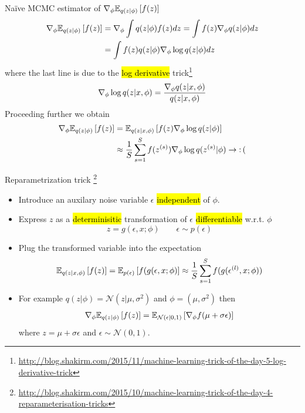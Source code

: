 \documentclass[unicode,11pt]{beamer}
\begin{document}
\begin{frame}{Na\"ive MCMC estimator of $\grad_\phi \E{q(z|\phi)}{f(z)}$}
  \begin{align*}
    \grad_\phi \E{q(z|\phi)}{f(z)}
    &= \grad_\phi \int q(z|\phi) f(z) dz
     = \int f(z) \grad_\phi q(z|\phi) dz \\
    &= \int f(z) q(z|\phi) \grad_\phi \log q(z|\phi) dz
  \end{align*}
  where the last line is due to the \hl{log derivative}
  trick\footnote{%
    \url{http://blog.shakirm.com/2015/11/machine-learning-trick-of-the-day-5-log-derivative-trick}}
  $$
  \nabla_\phi \log q(z|x, \phi) = \frac{\nabla_\phi q(z|x, \phi)}{q(z|x, \phi)}
  $$
  Proceeding further we obtain
  \begin{align*}
    \grad_\phi \E{q(z|\phi)}{f(z)}
    &= \E{q(z|x, \phi)}{f(z) \grad_\phi \log q(z|\phi)} \\
    &\approx \frac{1}{S} \sum\limits_{s = 1}^S f(z^{(s)}) \grad_\phi \log q(z^{(s)}|\phi)
    \to \op{:(}
  \end{align*}

\end{frame}


\begin{frame}{Reparametrization trick%
  \footnote{\url{http://blog.shakirm.com/2015/10/machine-learning-trick-of-the-day-4-reparameterisation-tricks}}}
  \begin{itemize}
  \item Introduce an auxilary noise variable $\epsilon$ \hl{independent} of
    $\phi$.
  \item Express $z$ as a \hl{determinisitic} transformation of $\epsilon$
    \hl{differentiable} w.r.t. $\phi$
    $$
    z = g(\epsilon, x; \phi)
    \qquad
    \epsilon \sim p(\epsilon)
    $$
  \item Plug the transformed variable into the expectation
    $$
    \E{q(z|x, \phi)}{f(z)}
    = \E{p(\epsilon)}{f(g(\epsilon, x; \phi)}
    \approx \frac{1}{S} \sum\limits_{s = 1}^S f(g(\epsilon^{(l)}, x; \phi))
    $$
  \item For example $q(z|\phi) = \mathcal{N}(z|\mu, \sigma^2)$ and
    $\phi = (\mu, \sigma^2)$ then
    \begin{align*}
      \grad_\phi \E{q(z|\phi)}{f(z)}
      = \E{\mathcal{N}(\epsilon|0, 1)}{\grad_\phi f(\mu + \sigma \epsilon)}
    \end{align*}
    where $z = \mu + \sigma\epsilon$ and $\epsilon \sim \mathcal{N}(0, 1)$.
  \end{itemize}
\end{frame}
\end{document}

